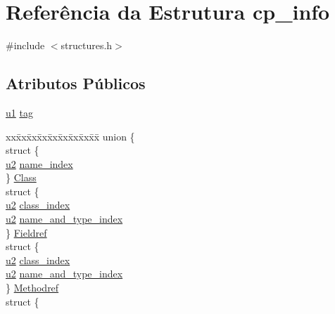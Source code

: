 \hypertarget{structcp__info}{}\section{Referência da Estrutura cp\+\_\+info}
\label{structcp__info}


{\ttfamily \#include $<$structures.\+h$>$}

\subsection*{Atributos Públicos}
\begin{DoxyCompactItemize}
\item 
\hyperlink{lista__operandos_8h_ad9f4cdb6757615aae2fad89dab3c5470}{u1} \hyperlink{structcp__info_a045b8801a6e96a2a31d3b62ea684f141}{tag}
\item 
\begin{tabbing}
xx\=xx\=xx\=xx\=xx\=xx\=xx\=xx\=xx\=\kill
union \{\\
\>struct \{\\
\>\>\hyperlink{lista__operandos_8h_a732cde1300aafb73b0ea6c2558a7a54f}{u2} \hyperlink{structcp__info_a0b2c4677d0d56defd858fdc796caec87}{name\_index}\\
\>\} \hyperlink{structcp__info_aa2cc42e313a1550a5f5e8c0d7ffc58ee}{Class}\\
\>struct \{\\
\>\>\hyperlink{lista__operandos_8h_a732cde1300aafb73b0ea6c2558a7a54f}{u2} \hyperlink{structcp__info_a1c7c3f3e2f9a620669b5f5cc51249ef8}{class\_index}\\
\>\>\hyperlink{lista__operandos_8h_a732cde1300aafb73b0ea6c2558a7a54f}{u2} \hyperlink{structcp__info_a1b947f3ff3eee58acf5500debf45848c}{name\_and\_type\_index}\\
\>\} \hyperlink{structcp__info_a9294f4a6ae7fb7a705ca3d01f4eb16d9}{Fieldref}\\
\>struct \{\\
\>\>\hyperlink{lista__operandos_8h_a732cde1300aafb73b0ea6c2558a7a54f}{u2} \hyperlink{structcp__info_a1c7c3f3e2f9a620669b5f5cc51249ef8}{class\_index}\\
\>\>\hyperlink{lista__operandos_8h_a732cde1300aafb73b0ea6c2558a7a54f}{u2} \hyperlink{structcp__info_a1b947f3ff3eee58acf5500debf45848c}{name\_and\_type\_index}\\
\>\} \hyperlink{structcp__info_a4afc97985c76278f209a037ed49247cd}{Methodref}\\
\>struct \{\\

\end{tabbing}
\end{DoxyCompactItemize}
